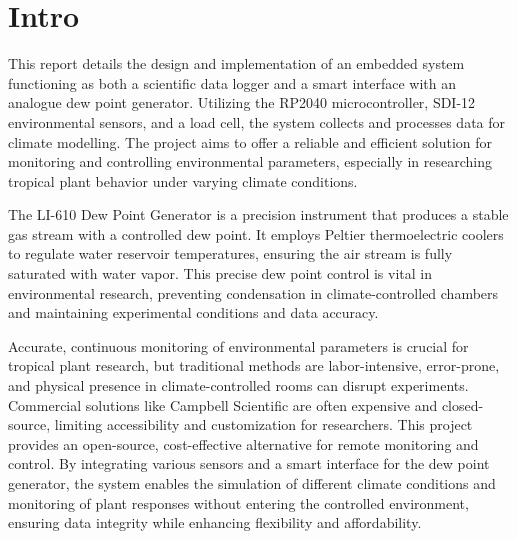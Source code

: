 \section{Intro}

This report details the design and implementation of an embedded system functioning as both a scientific data logger and a smart interface with an analogue dew point generator. Utilizing the RP2040 microcontroller, SDI-12 environmental sensors, and a load cell, the system collects and processes data for climate modelling. The project aims to offer a reliable and efficient solution for monitoring and controlling environmental parameters, especially in researching tropical plant behavior under varying climate conditions.

The LI-610 Dew Point Generator is a precision instrument that produces a stable gas stream with a controlled dew point. It employs Peltier thermoelectric coolers to regulate water reservoir temperatures, ensuring the air stream is fully saturated with water vapor. This precise dew point control is vital in environmental research, preventing condensation in climate-controlled chambers and maintaining experimental conditions and data accuracy.

Accurate, continuous monitoring of environmental parameters is crucial for tropical plant research, but traditional methods are labor-intensive, error-prone, and physical presence in climate-controlled rooms can disrupt experiments. Commercial solutions like Campbell Scientific are often expensive and closed-source, limiting accessibility and customization for researchers. This project provides an open-source, cost-effective alternative for remote monitoring and control. By integrating various sensors and a smart interface for the dew point generator, the system enables the simulation of different climate conditions and monitoring of plant responses without entering the controlled environment, ensuring data integrity while enhancing flexibility and affordability.